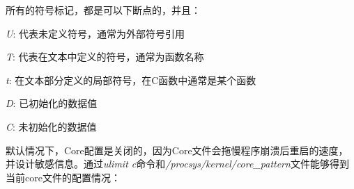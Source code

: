 \documentclass[12pt]{article}  %
\begin{document}
所有的符号标记，都是可以下断点的，并且：\par 
\emph{U}: 代表未定义符号，通常为外部符号引用\par
\emph{T}: 代表在文本中定义的符号，通常为函数名称\par
\emph{t}: 在文本部分定义的局部符号，在C函数中通常是某个函数\par
\emph{D}: 已初始化的数据值\par
\emph{C}: 未初始化的数据值\par
默认情况下，Core配置是关闭的，因为Core文件会拖慢程序崩溃后重启的速度，并设计敏感信息。通过\emph{ulimit \-c}命令和\emph{/procsys/kernel/core\_pattern}文件能够得到当前core文件的配置情况：\par
\begin{lstlisting}[language=sh]

\end{lstlisting}\par
\end{document}
